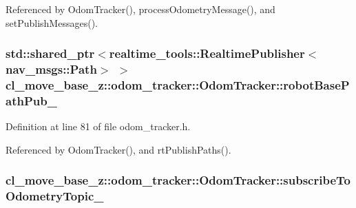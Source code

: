 Referenced by Odom\+Tracker(), process\+Odometry\+Message(), and set\+Publish\+Messages().

\subsubsection[{\texorpdfstring{robot\+Base\+Path\+Pub\+\_\+}{robotBasePathPub_}}]{\setlength{\rightskip}{0pt plus 5cm}std\+::shared\+\_\+ptr$<$realtime\+\_\+tools\+::\+Realtime\+Publisher$<$nav\+\_\+msgs\+::\+Path$>$ $>$ cl\+\_\+move\+\_\+base\+\_\+z\+::odom\+\_\+tracker\+::\+Odom\+Tracker\+::robot\+Base\+Path\+Pub\+\_\+\hspace{0.3cm}{\ttfamily [protected]}}\hypertarget{classcl__move__base__z_1_1odom__tracker_1_1OdomTracker_a40a7cbb6bb6595e250e7c685c781613b}{}\label{classcl__move__base__z_1_1odom__tracker_1_1OdomTracker_a40a7cbb6bb6595e250e7c685c781613b}


Definition at line 81 of file odom\+\_\+tracker.\+h.



Referenced by Odom\+Tracker(), and rt\+Publish\+Paths().

\subsubsection[{\texorpdfstring{subscribe\+To\+Odometry\+Topic\+\_\+}{subscribeToOdometryTopic_}}]{ cl\+\_\+move\+\_\+base\+\_\+z\+::odom\+\_\+tracker\+::\+Odom\+Tracker\+::subscribe\+To\+Odometry\+Topic\+\_\+\hspace{0.3cm}{\ttfamily [protected]}}\hypertarget{classcl__move__base__z_1_1odom__tracker_1_1OdomTracker_afbe614b53a1493eb8268b8ea65b5b93a}{}\label{classcl__move__base__z_1_1odom__tracker_1_1OdomTracker_afbe614b53a1493eb8268b8ea65b5b93a}


